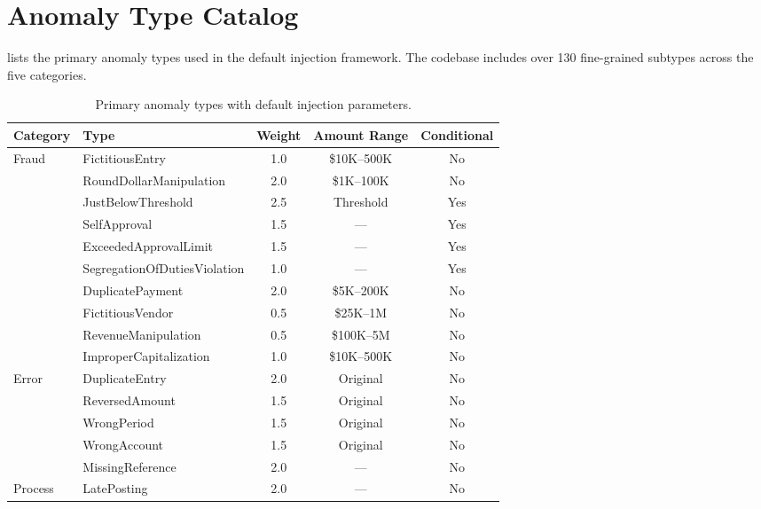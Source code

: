 \section{Anomaly Type Catalog}
\label{app:anomaly_catalog}

 lists the primary anomaly types used
in the default injection framework.  The codebase includes over 130
fine-grained subtypes across the five categories.

\begin{table}[H]
\centering
\caption{Primary anomaly types with default injection parameters.}
\label{tab:full_anomaly_catalog}
\small
\begin{tabular}{llccc}
\toprule
\textbf{Category} & \textbf{Type} & \textbf{Weight}
  & \textbf{Amount Range} & \textbf{Conditional} \\
\midrule
\multirow{7}{*}{Fraud}
  & FictitiousEntry              & 1.0 & \$10K--500K & No \\
  & RoundDollarManipulation      & 2.0 & \$1K--100K  & No \\
  & JustBelowThreshold           & 2.5 & Threshold   & Yes \\
  & SelfApproval                 & 1.5 & ---         & Yes \\
  & ExceededApprovalLimit        & 1.5 & ---         & Yes \\
  & SegregationOfDutiesViolation & 1.0 & ---         & Yes \\
  & DuplicatePayment             & 2.0 & \$5K--200K  & No \\
\cmidrule{2-5}
  & FictitiousVendor             & 0.5 & \$25K--1M   & No \\
  & RevenueManipulation          & 0.5 & \$100K--5M  & No \\
  & ImproperCapitalization       & 1.0 & \$10K--500K & No \\
\midrule
\multirow{5}{*}{Error}
  & DuplicateEntry               & 2.0 & Original    & No \\
  & ReversedAmount               & 1.5 & Original    & No \\
  & WrongPeriod                  & 1.5 & Original    & No \\
  & WrongAccount                 & 1.5 & Original    & No \\
  & MissingReference             & 2.0 & ---         & No \\
\midrule
\multirow{3}{*}{Process}
  & LatePosting                  & 2.0 & ---         & No \\

\end{tabular}
\end{table}
